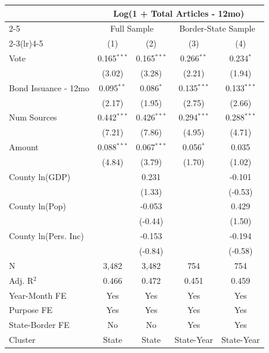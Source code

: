 \begingroup
\centering
\begin{tabular*}{\textwidth}{@{\extracolsep{\fill}}lcccc}
   \toprule
    & \multicolumn{4}{c}{Log(1 + Total Articles - 12mo)}\\
   \cmidrule(lr){2-5}
    & \multicolumn{2}{c}{Full Sample} & \multicolumn{2}{c}{Border-State Sample}\\
   \cmidrule(lr){2-3}\cmidrule(lr){4-5}
                        & (1)           & (2)           & (3)           & (4)\\  
   \midrule 
   Vote                 & 0.165$^{***}$ & 0.165$^{***}$ & 0.266$^{**}$  & 0.234$^{*}$\\   
                        & (3.02)       & (3.28)       & (2.21)       & (1.94)\\   
   Bond Issuance - 12mo & 0.095$^{**}$  & 0.086$^{*}$   & 0.135$^{***}$ & 0.133$^{***}$\\   
                        & (2.17)       & (1.95)       & (2.75)       & (2.66)\\   
   Num Sources          & 0.442$^{***}$ & 0.426$^{***}$ & 0.294$^{***}$ & 0.288$^{***}$\\   
                        & (7.21)       & (7.86)       & (4.95)       & (4.71)\\   
   Amount               & 0.088$^{***}$ & 0.067$^{***}$ & 0.056$^{*}$   & 0.035\\   
                        & (4.84)       & (3.79)       & (1.70)       & (1.02)\\   
   County ln(GDP)       &               & 0.231         &               & -0.101\\   
                        &               & (1.33)       &               & (-0.53)\\   
   County ln(Pop)       &               & -0.053        &               & 0.429\\   
                        &               & (-0.44)      &               & (1.50)\\   
   County ln(Pers. Inc) &               & -0.153        &               & -0.194\\   
                        &               & (-0.84)      &               & (-0.58)\\   
   \hline
   N         & 3,482         & 3,482         & 754           & 754\\  
   Adj. R$^2$       & 0.466         & 0.472         & 0.451         & 0.459\\  
   Year-Month FE        & Yes           & Yes           & Yes           & Yes\\  
   Purpose FE           & Yes           & Yes           & Yes           & Yes\\  
   State-Border FE      & No            & No            & Yes           & Yes\\  
   Cluster              & State & State & State-Year & State-Year\\  
   \bottomrule
\end{tabular*}
\par\endgroup
